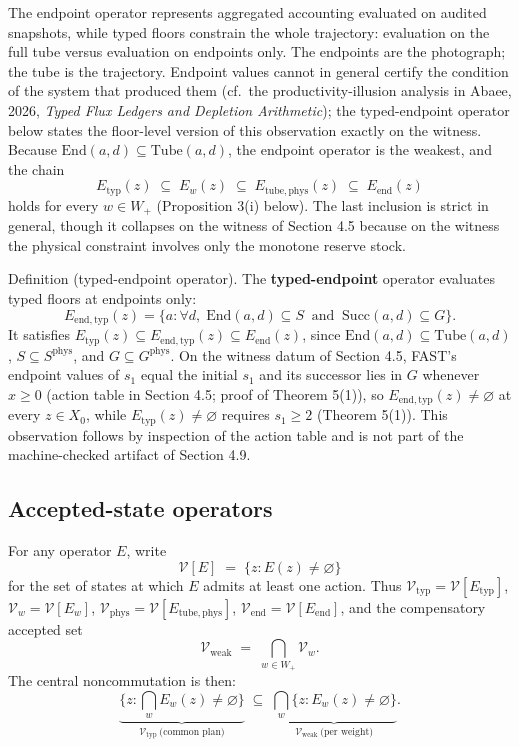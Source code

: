 \documentclass[review,11pt]{elsarticle}
\begin{document}
The endpoint operator represents aggregated accounting evaluated on audited snapshots, while typed floors constrain the whole trajectory: evaluation on the full tube versus evaluation on endpoints only. The endpoints are the photograph; the tube is the trajectory. Endpoint values cannot in general certify the condition of the system that produced them (cf.\ the productivity-illusion analysis in Abaee, 2026, \emph{Typed Flux Ledgers and Depletion Arithmetic}); the typed-endpoint operator below states the floor-level version of this observation exactly on the witness. Because \(\mathrm{End}(a,d) \subseteq \mathrm{Tube}(a,d)\), the
endpoint operator is the weakest, and the chain
\[E_{\mathrm{typ}}(z) \;\subseteq\; E_w(z) \;\subseteq\; E_{\mathrm{tube,phys}}(z) \;\subseteq\; E_{\mathrm{end}}(z)\]
holds for every \(w \in W_+\) (Proposition 3(i) below). The last
inclusion is strict in general, though it collapses on the witness of
Section 4.5 because on the witness the physical constraint involves only the monotone reserve stock.

Definition (typed-endpoint operator). The \textbf{typed-endpoint} operator evaluates typed floors at endpoints only:
\[E_{\mathrm{end,typ}}(z) = \{ a : \forall d,\; \mathrm{End}(a,d) \subseteq S \ \text{ and } \ \mathrm{Succ}(a,d) \subseteq G \}.\]
It satisfies \(E_{\mathrm{typ}}(z) \subseteq E_{\mathrm{end,typ}}(z) \subseteq E_{\mathrm{end}}(z)\), since \(\mathrm{End}(a,d) \subseteq \mathrm{Tube}(a,d)\), \(S \subseteq S^{\mathrm{phys}}\), and \(G \subseteq G^{\mathrm{phys}}\). On the witness datum of Section 4.5, FAST's endpoint values of \(s_1\) equal the initial \(s_1\) and its successor lies in \(G\) whenever \(x \ge 0\) (action table in Section 4.5; proof of Theorem 5(1)), so \(E_{\mathrm{end,typ}}(z) \neq \varnothing\) at every \(z \in X_0\), while \(E_{\mathrm{typ}}(z) \neq \varnothing\) requires \(s_1 \ge 2\) (Theorem 5(1)). This observation follows by inspection of the action table and is not part of the machine-checked artifact of Section 4.9.

\subsection{Accepted-state
operators}\label{accepted-state-operators}

For any operator \(E\), write
\[\mathcal{V}[E] \;=\; \{ z : E(z) \neq \varnothing \}\] for the set of
states at which \(E\) admits at least one action. Thus
\(\mathcal{V}_{\mathrm{typ}} = \mathcal{V}[E_{\mathrm{typ}}]\),
\(\mathcal{V}_w = \mathcal{V}[E_w]\),
\(\mathcal{V}_{\mathrm{phys}} = \mathcal{V}[E_{\mathrm{tube,phys}}]\),
\(\mathcal{V}_{\mathrm{end}} = \mathcal{V}[E_{\mathrm{end}}]\), and the
compensatory accepted set
\[\mathcal{V}_{\mathrm{weak}} \;=\; \bigcap_{w \in W_+} \mathcal{V}_w .\]
The central noncommutation is then:
\[\underbrace{\{ z : \textstyle\bigcap_w E_w(z) \neq \varnothing \}}_{\mathcal{V}_{\mathrm{typ}} \ \text{(common plan)}} \;\subseteq\; \underbrace{\bigcap_w \{ z : E_w(z) \neq \varnothing \}}_{\mathcal{V}_{\mathrm{weak}} \ \text{(per weight)}}.\]
\end{document}
